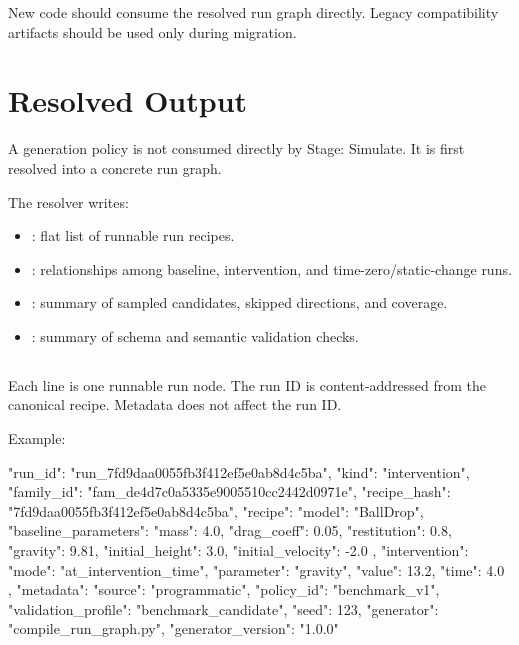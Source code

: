 \documentclass[11pt]{article}
\begin{document}
New code should consume the resolved run graph directly.
Legacy compatibility artifacts should be used only during migration.

\section*{Resolved Output}

A generation policy is not consumed directly by Stage: Simulate.
It is first resolved into a concrete run graph.

The resolver writes:

\begin{itemize}
    \item {}: flat list of runnable run recipes.
    \item {}: relationships among baseline, intervention, and time-zero/static-change runs.
    \item {}: summary of sampled candidates, skipped directions, and coverage.
    \item {}: summary of schema and semantic validation checks.
\end{itemize}

\subsection*{}

Each line is one runnable run node.
The run ID is content-addressed from the canonical recipe.
Metadata does not affect the run ID.

Example:

\begin{DocCode}
{
  "run_id": "run_7fd9daa0055fb3f412ef5e0ab8d4c5ba",
  "kind": "intervention",
  "family_id": "fam_de4d7c0a5335e9005510cc2442d0971e",
  "recipe_hash": "7fd9daa0055fb3f412ef5e0ab8d4c5ba",
  "recipe": {
    "model": "BallDrop",
    "baseline_parameters": {
      "mass": 4.0,
      "drag_coeff": 0.05,
      "restitution": 0.8,
      "gravity": 9.81,
      "initial_height": 3.0,
      "initial_velocity": -2.0
    },
    "intervention": {
      "mode": "at_intervention_time",
      "parameter": "gravity",
      "value": 13.2,
      "time": 4.0
    }
  },
  "metadata": {
    "source": "programmatic",
    "policy_id": "benchmark_v1",
    "validation_profile": "benchmark_candidate",
    "seed": 123,
    "generator": "compile_run_graph.py",
    "generator_version": "1.0.0"
  }
}
\end{DocCode}
\end{document}
